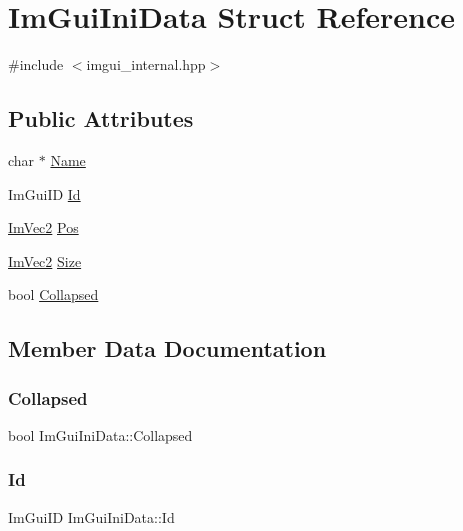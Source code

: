 \hypertarget{struct_im_gui_ini_data}{}\section{Im\+Gui\+Ini\+Data Struct Reference}
\label{struct_im_gui_ini_data}


{\ttfamily \#include $<$imgui\+\_\+internal.\+hpp$>$}

\subsection*{Public Attributes}
\begin{DoxyCompactItemize}
\item 
char $\ast$ \hyperlink{struct_im_gui_ini_data_aef4db96cc7332d492bba873028a00f66}{Name}
\item 
Im\+Gui\+ID \hyperlink{struct_im_gui_ini_data_a8c3cd42549a5f432199d1a66e0133d80}{Id}
\item 
\hyperlink{struct_im_vec2}{Im\+Vec2} \hyperlink{struct_im_gui_ini_data_a8598c0d937901fc22f808f11f9aa6bac}{Pos}
\item 
\hyperlink{struct_im_vec2}{Im\+Vec2} \hyperlink{struct_im_gui_ini_data_af3d56b3e89c45d07d7927ab95dbd86fa}{Size}
\item 
bool \hyperlink{struct_im_gui_ini_data_a299660ea0cab78a8cbefa02314c8cf47}{Collapsed}
\end{DoxyCompactItemize}


\subsection{Member Data Documentation}
\hypertarget{struct_im_gui_ini_data_a299660ea0cab78a8cbefa02314c8cf47}{}\label{struct_im_gui_ini_data_a299660ea0cab78a8cbefa02314c8cf47} 
\subsubsection{\texorpdfstring{Collapsed}{Collapsed}}
{\footnotesize\ttfamily bool Im\+Gui\+Ini\+Data\+::\+Collapsed}

\hypertarget{struct_im_gui_ini_data_a8c3cd42549a5f432199d1a66e0133d80}{}\label{struct_im_gui_ini_data_a8c3cd42549a5f432199d1a66e0133d80} 
\subsubsection{\texorpdfstring{Id}{Id}}
{\footnotesize\ttfamily Im\+Gui\+ID Im\+Gui\+Ini\+Data\+::\+Id}

